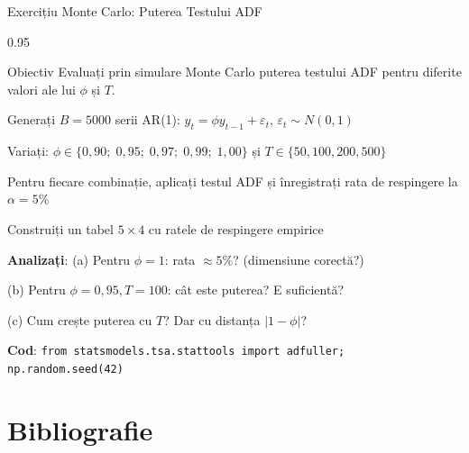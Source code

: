 \documentclass[9pt, aspectratio=169, t]{beamer}
\begin{document}
\begin{frame}{Exercițiu Monte Carlo: Puterea Testului ADF}
    \begin{cminipage}{0.95\textwidth}
        \begin{block}{Obiectiv}
            Evaluați prin simulare Monte Carlo puterea testului ADF pentru diferite valori ale lui $\phi$ și $T$.
        \end{block}
        \begin{enumerate}\setlength{\itemsep}{2pt}
            {\small
            \item Generați $B = 5000$ serii AR(1): $y_t = \phi y_{t-1} + \varepsilon_t$, $\varepsilon_t \sim N(0,1)$
            \item Variați: $\phi \in \{0{,}90;\; 0{,}95;\; 0{,}97;\; 0{,}99;\; 1{,}00\}$ și $T \in \{50, 100, 200, 500\}$
            \item Pentru fiecare combinație, aplicați testul ADF și înregistrați rata de respingere la $\alpha = 5\%$
            \item Construiți un tabel $5 \times 4$ cu ratele de respingere empirice
            \item \textbf{Analizați}: (a) Pentru $\phi = 1$: rata $\approx 5\%$? (dimensiune corectă?)
            \item[] (b) Pentru $\phi = 0{,}95, T = 100$: cât este puterea? E suficientă?
            \item[] (c) Cum crește puterea cu $T$? Dar cu distanța $|1 - \phi|$?
            }
        \end{enumerate}
        {\footnotesize \textbf{Cod}: \texttt{from statsmodels.tsa.stattools import adfuller; np.random.seed(42)}}
    \end{cminipage}
\end{frame}

\section{Bibliografie}
\end{document}
